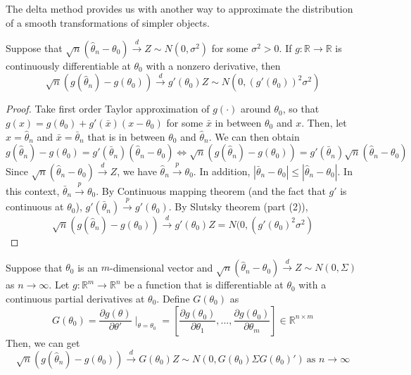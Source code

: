  The delta method provides us with another way to approximate the distribution of a smooth transformations of simpler 
objects. 
\begin{mdframed}[backgroundcolor=green!5] 
\begin{theorem}
Suppose that $\sqrt{n}(\hat{\theta}_n-\theta_0)\xrightarrow{d}Z\sim N(0,\sigma^2)$ for some $\sigma^2>0$. If $g:\mathbb{R}\to\mathbb{R}$ is continuously differentiable at $\theta_0$ with a nonzero derivative, then
\[
\sqrt{n}(g(\hat{\theta}_n)-g(\theta_0))\xrightarrow{d}g'(\theta_0)Z\sim N(0,(g'(\theta_0))^2\sigma^2)
\]
\end{theorem}
\begin{proof}
Take first order Taylor approximation of $g(\cdot)$ around $\theta_0$, so that $g(x)= g(\theta_0)+g'(\bar{x})(x-\theta_0)$ for some $\bar{x}$ in between $\theta_0$ and $x$. Then, let $x=\hat{\theta}_n$ and $\bar{x}=\bar{\theta}_n$ that is in between $\theta_0$ and $\hat{\theta}_n$. We can then obtain
\[
g(\hat{\theta}_n)-g(\theta_0)=g'(\bar{\theta}_n)(\hat{\theta}_n-\theta_0)\iff\sqrt{n}(g(\hat{\theta}_n)-g(\theta_0))=g'(\bar{\theta}_n)\sqrt{n}(\hat{\theta}_n-\theta_0)
\]
Since $\sqrt{n}(\hat{\theta}_n-\theta_0)\xrightarrow{d}Z$, we have $\hat{\theta}_n\xrightarrow{p}\theta_0$. In addition, $|
\bar{\theta}_n-\theta_0|\leq |\hat{\theta}_n-\theta_0|$. In this context, $\bar{\theta}_n\xrightarrow{p}\theta_0$.  By Continuous mapping theorem (and the fact that $g'$ is continuous at $\theta_0$), $g'(\bar{\theta}_n)\xrightarrow{p}g'(\theta_0)$. By Slutsky theorem (part (2)),  
\[
\sqrt{n}(g(\hat{\theta}_n)-g(\theta_0))\xrightarrow{d}g'(\theta_0)Z=N(0,(g'(\theta_0)^2\sigma^2 )
\]
\end{proof}
\begin{theorem}
Suppose that $\theta_0$ is an $m$-dimensional vector and $\sqrt{n}(\hat{\theta}_n-\theta_0)\xrightarrow{d}Z\sim N(0,\Sigma)$ as $n\to\infty$. Let $g:\mathbb{R}^m\to\mathbb{R}^n$ be a function that is differentiable at $\theta_0$ with a continuous partial derivatives at $\theta_0$. Define $G(\theta_0)$ as
\[
G(\theta_0)=\frac{\partial g(\theta)}{\partial\theta'}\mid_{\theta=\theta_0}=\left[\frac{\partial g(\theta_0)}{\partial \theta_1} , ...,\frac{\partial g(\theta_0)}{\partial \theta_m} \right]\in\mathbb{R}^{n\times m}
\]
Then, we can get
\[
\sqrt{n}(g(\hat{\theta}_n)-g(\theta_0))\xrightarrow{d}G(\theta_0)Z\sim N(0, G(\theta_0)\Sigma G(\theta_0)') \ \text{as } n\to\infty
\]
\end{theorem}
\end{mdframed}\par
